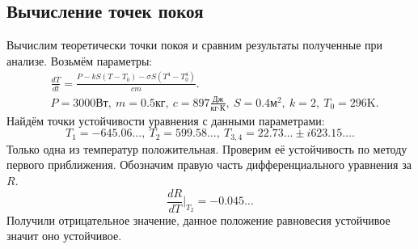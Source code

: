     \subsection{Вычисление точек покоя}
        Вычислим теоретически точки покоя и сравним результаты полученные при анализе. Возьмём параметры:
        \[
            \begin{split}
                & \frac{dT}{dt} = \frac{P - k S (T - T_0) - \sigma S (T^4 - T_0^4)}{cm}. \\
                & P = 3000 \text{Вт}, ~ m = 0.5 \text{кг}, ~ c = 897 \frac{\text{Дж}}{\text{кг} \cdot \text{К}}, ~ S = 0.4 \text{м}^2, ~ k = 2, ~ T_0 = 296 \text{K}.
            \end{split}
        \]
        Найдём точки устойчивости уравнения с данными параметрами:
        \[
            T_1 = -645.06\dots, ~
            T_2 = 599.58\dots, ~
            T_{3,4} = 22.73\dots \pm i 623.15\dots.
        \]
        Только одна из температур положительная. Проверим её устойчивость по методу первого приближения. Обозначим правую часть дифференциального уравнения за $ R $.
        \[
            \frac{dR}{dT}\big|_{T_2} = -0.045\dots
        \]
        Получили отрицательное значение, данное положение равновесия устойчивое значит оно устойчивое.
